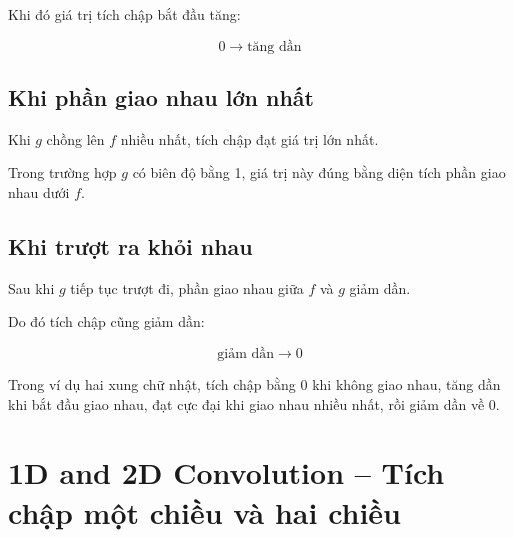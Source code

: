 Khi đó giá trị tích chập bắt đầu tăng:

\[
    0
    \rightarrow
    \text{tăng dần}
\]

\subsection{Khi phần giao nhau lớn nhất}

Khi $g$ chồng lên $f$ nhiều nhất, tích chập đạt giá trị lớn nhất.

Trong trường hợp $g$ có biên độ bằng 1, giá trị này đúng bằng diện tích phần giao nhau dưới $f$.

\subsection{Khi trượt ra khỏi nhau}

Sau khi $g$ tiếp tục trượt đi, phần giao nhau giữa $f$ và $g$ giảm dần.

Do đó tích chập cũng giảm dần:

\[
    \text{giảm dần}
    \rightarrow
    0
\]

\begin{center}
\end{center}

\begin{ghinho}
Trong ví dụ hai xung chữ nhật, tích chập bằng 0 khi không giao nhau, tăng dần khi bắt đầu giao nhau, đạt cực đại khi giao nhau nhiều nhất, rồi giảm dần về 0.
\end{ghinho}

\section{1D and 2D Convolution -- Tích chập một chiều và hai chiều}

